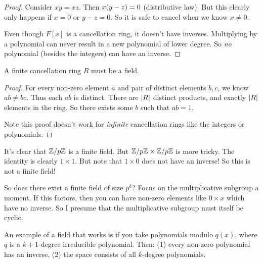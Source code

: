 \begin{proof}
  Consider $xy = xz$. Then $x \mathopen{}\left( {y - z} \right)\mathclose{} = 0$ (distributive law).
  But this clearly only happens if $x = 0$ or $y - z = 0$. So it is safe
  to cancel when we know $x \ne 0$.

  Even though $F[x]$ is a cancellation ring, it doesn't have inverses.
  Multiplying by a polynomial can never result in a new polynomial of
  lower degree. So \emph{no} polynomial (besides the integers) can have
  an inverse.
\end{proof}

\begin{proposition}
  A finite cancellation ring $R$ must be a field.
\end{proposition}

\begin{proof}
  For every non-zero element $a$ and pair of distinct elements $b, c$,
  we know $ab \ne bc$. Thus each $ab$ is distinct. There are $|R|$
  distinct products, and exactly $|R|$ elements in the ring. So
  there exists some $b$ such that $ab = 1$.

  Note this proof doesn't work for \emph{infinite} cancellation rings
  like the integers or polynomials.
\end{proof}

\begin{remark}
  It's clear that $\mathbb{Z} / p\mathbb{Z}$ is a finite field. But $\mathbb{Z} / p\mathbb{Z} \times \mathbb{Z} / p\mathbb{Z}$
  is more tricky. The identity is clearly $1 \times 1$. But note that $1
  \times 0$ does not have an inverse! So this is not a finite field!

  So does there exist a finite field of size $p^k$? Focus on the
  multiplicative subgroup a moment. If this factors, then you can have
  non-zero elements like $0 \times x$ which have no inverse. So I
  presume that the multiplicative subgroup must itself be cyclic.

  An example of a field that works is if you take polynomials modulo
  $q(x)$, where $q$ is a $k+1$-degree irreducible polynomial. Then: (1)
  every non-zero polynomial has an inverse, (2) the space consists of
  all $k$-degree polynomials.
\end{remark}

